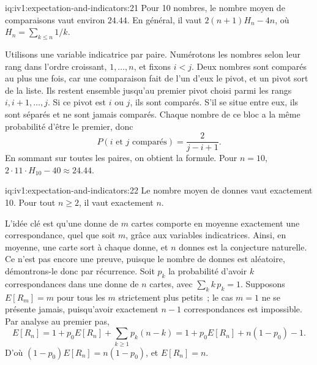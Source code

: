 \begin{solution}{iq:iv1:expectation-and-indicators:21}
Pour 10 nombres, le nombre moyen de comparaisons vaut environ $24.44$. En général, il vaut $2(n+1)H_n - 4n$, où $H_n = \sum_{k \le n} 1/k$.

Utilisons une variable indicatrice par paire. Numérotons les nombres selon leur rang dans l'ordre croissant, $1, \dots, n$, et fixons $i < j$. Deux nombres sont comparés au plus une fois, car une comparaison fait de l'un d'eux le pivot, et un pivot
sort de la liste. Ils restent ensemble jusqu'au premier pivot choisi parmi les rangs $i, i+1, \dots, j$. Si ce pivot est $i$ ou $j$, ils sont comparés. S'il se situe entre eux, ils sont séparés et ne sont jamais
comparés. Chaque nombre de ce bloc a la même probabilité d'être le premier, donc
\[
P(i \text{ et } j \text{ comparés}) = \frac{2}{j - i + 1}.
\]
En sommant sur toutes les paires, on obtient la formule. Pour $n = 10$, $2 \cdot 11 \cdot H_{10} - 40 \approx 24.44$.

\end{solution}

\begin{solution}{iq:iv1:expectation-and-indicators:22}
Le nombre moyen de donnes vaut exactement 10. Pour tout $n \ge 2$, il vaut exactement $n$.

L'idée clé est qu'une donne de $m$ cartes comporte en moyenne exactement une correspondance, quel que soit $m$, grâce aux variables indicatrices. Ainsi, en moyenne, une carte sort à chaque donne, et $n$ donnes est la conjecture naturelle. Ce n'est pas encore une preuve, puisque le nombre de donnes est aléatoire, démontrons-le donc par
récurrence. Soit $p_k$ la probabilité d'avoir $k$ correspondances dans une donne de $n$ cartes, avec $\sum_k k\,p_k = 1$. Supposons $E[R_m] = m$ pour tous les $m$ strictement plus petits~; le cas $m = 1$ ne se présente jamais, puisqu'avoir exactement $n - 1$ correspondances est impossible. Par analyse au premier pas,
\[
E[R_n] = 1 + p_0 E[R_n] + \sum_{k \ge 1} p_k (n - k) = 1 + p_0 E[R_n] + n(1 - p_0) - 1.
\]
D'où $(1 - p_0)E[R_n] = n(1 - p_0)$, et $E[R_n] = n$.

\end{solution}

